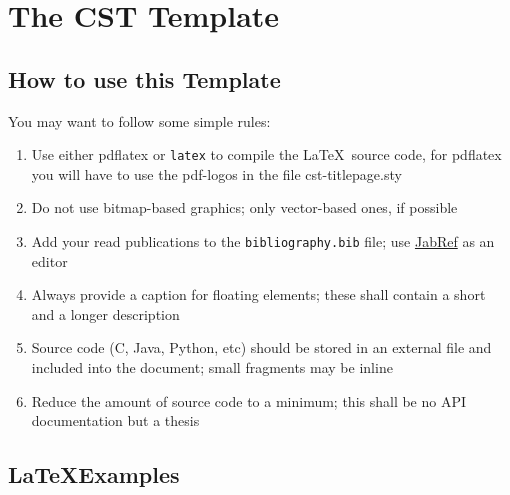 \chapter{The CST Template}

\section{How to use this Template}
\label{secHowTo}

You may want to follow some simple rules:
\begin{enumerate}
    \item Use either \gls{pdflatex} or {\tt latex} to compile the
      \LaTeX\ source code, for pdflatex you will have to use the
      pdf-logos in the file cst-titlepage.sty
	\item Do not use bitmap-based graphics; only vector-based
          ones, if possible 
	\item Add your read publications to the \texttt{bibliography.bib} file; use \href{http://jabref.sourceforge.net/}{JabRef} as an editor
	\item Always provide a caption for floating elements; these shall contain a short and a longer description
	\item Source code (C, Java, Python, etc) should be stored in an external file and included into the document; small fragments may be inline
	\item Reduce the amount of source code to a minimum; this shall be no API documentation but a thesis
\end{enumerate}

\section{\LaTeX Examples}


